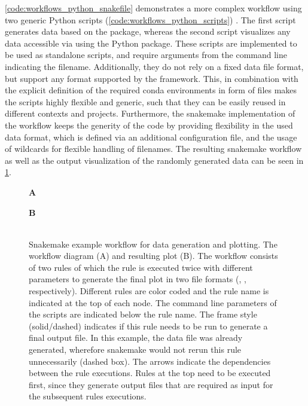 \cref{code:workflows_python_snakefile} demonstrates a more complex workflow using two generic Python scripts (\cref{code:workflows_python_scripts}) . The first script generates data based on the  package, whereas the second script visualizes any data accessible via  using the Python  package. These scripts are implemented to be used as standalone scripts, and require arguments from the command line indicating the filename. Additionally, they do not rely on a fixed data file format, but support any format supported by the   framework. This, in combination with the explicit definition of the required conda environments in form of  files makes the scripts highly flexible and generic, such that they can be easily reused in different contexts and projects. Furthermore, the snakemake implementation of the workflow keeps the generity of the code by providing flexibility in the used data format, which is defined via an additional configuration  file, and the usage of wildcards for flexible handling of filenames. The resulting snakemake workflow as well as the output visualization of the randomly generated data can be seen in \cref{fig:python_demo}.

\begin{figure}
    \begin{minipage}[t]{0.4\textwidth}
    \textbf{A}\\
    
    \end{minipage}
    \begin{minipage}[t]{0.6\textwidth}
    \textbf{B}\\
    \\
    \end{minipage}
 \caption[Snakemake example workflow for data generation and plotting]{Snakemake example workflow for data generation and plotting. The workflow diagram (A) and resulting plot (B). The workflow consists of two rules of which the  rule is executed twice with different parameters to generate the final plot in two file formats (, , respectively). Different rules are color coded and the rule name is indicated at the top of each node.  The command line parameters of the scripts are indicated below the rule name. The frame style (solid/dashed) indicates if this rule needs to be run to generate a final output file. In this example, the data file was already generated, wherefore snakemake would not rerun this rule unnecessarily (dashed box). The arrows indicate the dependencies between the rule executions. Rules at the top need to be executed first, since they generate output files that are required as input for the subsequent rules executions.}
\label{fig:python_demo}
\end{figure}


